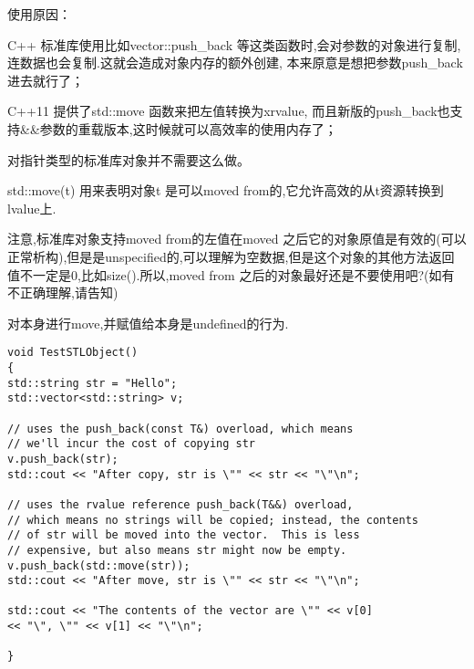 使用原因：

C++ 标准库使用比如vector::push\_back 等这类函数时,会对参数的对象进行复制,连数据也会复制.这就会造成对象内存的额外创建, 本来原意是想把参数push\_back进去就行了；

C++11 提供了std::move 函数来把左值转换为xrvalue, 而且新版的push\_back也支持\&\&参数的重载版本,这时候就可以高效率的使用内存了；

对指针类型的标准库对象并不需要这么做。

std::move(t) 用来表明对象t 是可以moved from的,它允许高效的从t资源转换到lvalue上.

注意,标准库对象支持moved from的左值在moved 之后它的对象原值是有效的(可以正常析构),但是是unspecified的,可以理解为空数据,但是这个对象的其他方法返回值不一定是0,比如size().所以,moved from 之后的对象最好还是不要使用吧?(如有不正确理解,请告知)

对本身进行move,并赋值给本身是undefined的行为.

\begin{lstlisting}
void TestSTLObject()
{
std::string str = "Hello";
std::vector<std::string> v;

// uses the push_back(const T&) overload, which means
// we'll incur the cost of copying str
v.push_back(str);
std::cout << "After copy, str is \"" << str << "\"\n";

// uses the rvalue reference push_back(T&&) overload,
// which means no strings will be copied; instead, the contents
// of str will be moved into the vector.  This is less
// expensive, but also means str might now be empty.
v.push_back(std::move(str));
std::cout << "After move, str is \"" << str << "\"\n";

std::cout << "The contents of the vector are \"" << v[0]
<< "\", \"" << v[1] << "\"\n";

}
\end{lstlisting}

